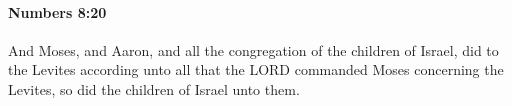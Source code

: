 
		\paragraph{Numbers 8:20} %
			\label{NUMBERS-8-20}

			And Moses, and Aaron, and all the congregation of the children of Israel, did to the Levites according unto all that the LORD commanded Moses concerning the Levites, so did the children of Israel unto them.


